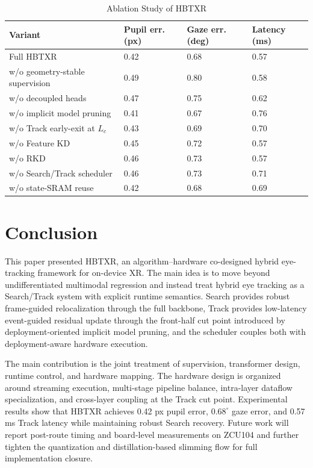 \documentclass[journal]{IEEEtran}
\begin{document}
\begin{table}[t]
\caption{Ablation Study of HBTXR}
\label{tab:ablation}
\centering
\footnotesize
{\setlength{\tabcolsep}{3pt}
\begin{tabularx}{\columnwidth}{@{}L{0.50\columnwidth}C{0.13\columnwidth}C{0.13\columnwidth}C{0.14\columnwidth}@{}}
\toprule
Variant & Pupil err. (px) & Gaze err. (deg) & Latency (ms) \\
\midrule
Full HBTXR & 0.42 & 0.68 & 0.57 \\
w/o geometry-stable supervision & 0.49 & 0.80 & 0.58 \\
w/o decoupled heads & 0.47 & 0.75 & 0.62 \\
w/o implicit model pruning & 0.41 & 0.67 & 0.76 \\
w/o Track early-exit at $L_c$ & 0.43 & 0.69 & 0.70 \\
w/o Feature KD & 0.45 & 0.72 & 0.57 \\
w/o RKD & 0.46 & 0.73 & 0.57 \\
w/o Search/Track scheduler & 0.46 & 0.73 & 0.71 \\
w/o state-SRAM reuse & 0.42 & 0.68 & 0.69 \\
\bottomrule
\end{tabularx}}
\end{table}

\section{Conclusion}

This paper presented HBTXR, an algorithm--hardware co-designed hybrid eye-tracking framework for on-device XR. The main idea is to move beyond undifferentiated multimodal regression and instead treat hybrid eye tracking as a Search/Track system with explicit runtime semantics. Search provides robust frame-guided relocalization through the full backbone, Track provides low-latency event-guided residual update through the front-half cut point introduced by deployment-oriented implicit model pruning, and the scheduler couples both with deployment-aware hardware execution.

The main contribution is the joint treatment of supervision, transformer design, runtime control, and hardware mapping. The hardware design is organized around streaming execution, multi-stage pipeline balance, intra-layer dataflow specialization, and cross-layer coupling at the Track cut point. Experimental results show that HBTXR achieves 0.42 px pupil error, $0.68^{\circ}$ gaze error, and 0.57 ms Track latency while maintaining robust Search recovery. Future work will report post-route timing and board-level measurements on ZCU104 and further tighten the quantization and distillation-based slimming flow for full implementation closure.
\end{document}
